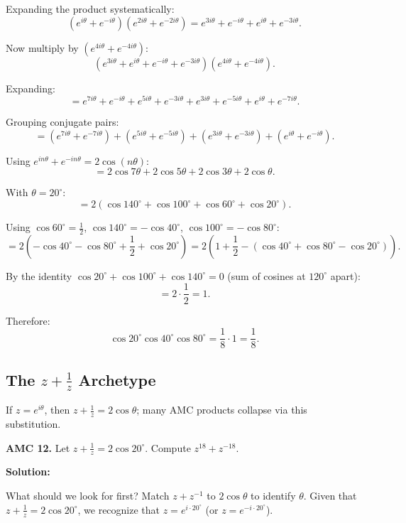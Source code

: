 \documentclass[12pt]{extarticle}
\begin{document}
Expanding the product systematically:
\[
(e^{i\theta} + e^{-i\theta})(e^{2i\theta} + e^{-2i\theta}) = e^{3i\theta} + e^{-i\theta} + e^{i\theta} + e^{-3i\theta}.
\]

Now multiply by $(e^{4i\theta} + e^{-4i\theta})$:
\[
(e^{3i\theta} + e^{i\theta} + e^{-i\theta} + e^{-3i\theta})(e^{4i\theta} + e^{-4i\theta}).
\]

Expanding:
\[
= e^{7i\theta} + e^{-i\theta} + e^{5i\theta} + e^{-3i\theta} + e^{3i\theta} + e^{-5i\theta} + e^{i\theta} + e^{-7i\theta}.
\]

Grouping conjugate pairs:
\[
= (e^{7i\theta} + e^{-7i\theta}) + (e^{5i\theta} + e^{-5i\theta}) + (e^{3i\theta} + e^{-3i\theta}) + (e^{i\theta} + e^{-i\theta}).
\]

Using $e^{in\theta} + e^{-in\theta} = 2\cos(n\theta)$:
\[
= 2\cos 7\theta + 2\cos 5\theta + 2\cos 3\theta + 2\cos\theta.
\]

With $\theta = 20^\circ$:
\[
= 2(\cos 140^\circ + \cos 100^\circ + \cos 60^\circ + \cos 20^\circ).
\]

Using $\cos 60^\circ = \frac{1}{2}$, $\cos 140^\circ = -\cos 40^\circ$, $\cos 100^\circ = -\cos 80^\circ$:
\[
= 2\left(-\cos 40^\circ - \cos 80^\circ + \frac{1}{2} + \cos 20^\circ\right) = 2\left(1 + \frac{1}{2} - (\cos 40^\circ + \cos 80^\circ - \cos 20^\circ)\right).
\]

By the identity $\cos 20^\circ + \cos 100^\circ + \cos 140^\circ = 0$ (sum of cosines at $120^\circ$ apart):
\[
= 2 \cdot \frac{1}{2} = 1.
\]

Therefore:
\[
\cos 20^\circ \cos 40^\circ \cos 80^\circ = \frac{1}{8} \cdot 1 = \frac{1}{8}.
\]


\subsection*{The $z + \tfrac{1}{z}$ Archetype}
If $z = e^{i\theta}$, then $z + \tfrac{1}{z} = 2\cos\theta$; many AMC products collapse via this substitution.

\begin{examplebox}
\textbf{AMC 12.} Let $z + \tfrac{1}{z} = 2\cos 20^\circ$. Compute $z^{18} + z^{-18}$.
\end{examplebox}

\textbf{Solution:}

What should we look for first? Match $z + z^{-1}$ to $2\cos\theta$ to identify $\theta$.
Given that $z + \tfrac{1}{z} = 2\cos 20^\circ$, we recognize that $z = e^{i \cdot 20^\circ}$ (or $z = e^{-i \cdot 20^\circ}$).
\end{document}
